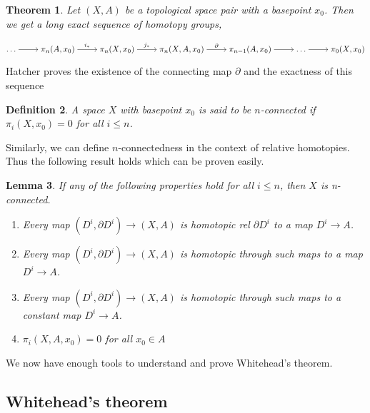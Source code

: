 \documentclass[12pt]{extarticle}
\newcounter{pic}[page]
\numberwithin{equation}{section}
\newtheorem{thm}{Theorem}[section]
\newtheorem{lem}[thm]{Lemma}
\newtheorem{defn}[thm]{Definition}
\begin{document}
\begin{thm}\cite[p.~344]{Hatcher}
Let $(X,A)$ be a topological space pair with a basepoint $x_0$. Then we get a long exact sequence of homotopy groups,

\[\begin{tikzcd}[/tikz/commutative diagrams/cramped]
	\dots & {\pi_n(A,x_0)} & {\pi_n(X,x_0)} & {\pi_n(X,A,x_0)} & {\pi_{n-1}(A,x_0)} & \dots & {\pi_0(X,x_0)}
	\arrow["{i_*}", from=1-2, to=1-3]
	\arrow["{j_*}", from=1-3, to=1-4]
	\arrow["\partial", from=1-4, to=1-5]
	\arrow[from=1-5, to=1-6]
	\arrow[from=1-6, to=1-7]
	\arrow[from=1-1, to=1-2]
\end{tikzcd}\]
\end{thm}

Hatcher proves the existence of the connecting map $\partial$ and the exactness of this sequence
\begin{defn}
A space $X$ with basepoint $x_0$ is said to be $n$-connected if $\pi_i(X,x_0)=0$ for all $i\leq n$.
\end{defn}

Similarly, we can define $n$-connectedness in the context of relative homotopies.\\

Thus the following result holds which can be proven easily.\\

\begin{lem}\cite[p.~346]{Hatcher}
If any of the following properties hold for all $i\leq n$, then $X$ is n-connected.

\begin{enumerate}
    \item Every map $(D^i,\partial D^i)\to(X,A)$ is homotopic rel $\partial D^i$ to a map $D^i\to A$.
    \item Every map $(D^i,\partial D^i)\to(X,A)$ is homotopic through such maps to a map $D^i\to A$.
    \item Every map $(D^i,\partial D^i)\to(X,A)$ is homotopic through such maps to a constant map $D^i\to A$.
    \item $\pi_i(X,A,x_0) = 0$ for all $x_0 \in A$
\end{enumerate}
\end{lem}

We now have enough tools to understand and prove Whitehead's theorem.\\

\subsection{Whitehead's theorem}
\end{document}
